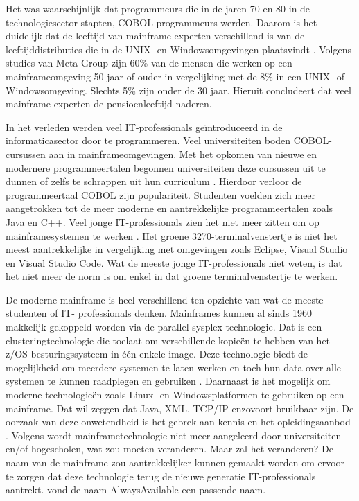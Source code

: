 Het was waarschijnlijk dat programmeurs die in de jaren 70 en 80 in de technologiesector stapten, COBOL-programmeurs werden. Daarom is het duidelijk dat de leeftijd van mainframe-experten verschillend is van de leeftijddistributies die in de UNIX- en Windowsomgevingen plaatsvindt \autocite{McGirr2004}. Volgens studies van Meta Group zijn 60\% van de mensen die werken op een mainframeomgeving  50 jaar of ouder in vergelijking met de 8\% in een UNIX- of Windowsomgeving. Slechts 5\% zijn onder de 30 jaar. Hieruit concludeert  \textcite{McGirr2004} dat veel mainframe-experten de pensioenleeftijd naderen. 

In het verleden werden veel IT-professionals geïntroduceerd in de informaticasector door te programmeren. Veel universiteiten boden COBOL-cursussen aan in mainframeomgevingen. Met het opkomen van nieuwe en modernere programmeertalen begonnen universiteiten deze cursussen uit te dunnen of zelfs te schrappen uit hun curriculum  \autocite{Mullins2016}. Hierdoor verloor de programmeertaal COBOL zijn populariteit. Studenten voelden zich meer aangetrokken tot de meer moderne en aantrekkelijke programmeertalen zoals Java en C++. Veel jonge IT-professionals zien het niet meer zitten om op mainframesystemen te werken \autocite{Mullins2016}. Het groene 3270-terminalvenstertje is niet het meest aantrekkelijke in vergelijking met omgevingen zoals Eclipse, Visual Studio en Visual Studio Code. Wat de meeste jonge IT-professionals niet weten, is dat het niet meer de norm is om enkel in dat groene terminalvenstertje te werken. 

De moderne mainframe is heel verschillend ten opzichte van wat de meeste studenten of IT- professionals denken. Mainframes kunnen al sinds 1960 makkelijk gekoppeld worden via de parallel sysplex technologie. Dat is een clusteringtechnologie die toelaat om verschillende kopieën te hebben van het z/OS besturingssysteem in één enkele image. Deze technologie biedt de mogelijkheid om meerdere systemen te laten werken en toch hun data over alle systemen te kunnen raadplegen en gebruiken \autocite{Sarkar2020}. Daarnaast is het mogelijk om moderne technologieën zoals Linux- en Windowsplatformen te gebruiken op een mainframe. Dat wil zeggen dat Java, XML, TCP/IP enzovoort bruikbaar zijn. De oorzaak van deze onwetendheid is het gebrek aan kennis en het opleidingsaanbod \autocite{Mullins2016}. Volgens \textcite{Mullins2016} wordt mainframetechnologie niet meer aangeleerd door universiteiten en/of hogescholen, wat zou moeten veranderen. Maar zal het veranderen? De naam van de mainframe zou aantrekkelijker kunnen gemaakt worden om ervoor te zorgen dat deze technologie terug de nieuwe generatie IT-professionals aantrekt. \textcite{Mullins2016} vond de naam AlwaysAvailable een passende naam.


